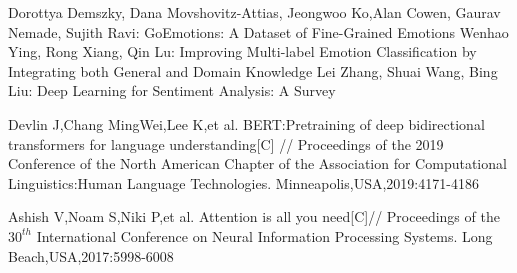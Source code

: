 \documentclass[12pt,twocolumn,letterpaper]{article}
\begin{document}
\begin{thebibliography}{99} 
Dorottya Demszky, Dana Movshovitz-Attias, Jeongwoo Ko,Alan Cowen, Gaurav Nemade, Sujith Ravi:  GoEmotions: A Dataset of Fine-Grained Emotions
Wenhao Ying, Rong Xiang, Qin Lu: Improving Multi-label Emotion Classification by Integrating both General and Domain Knowledge
Lei Zhang, Shuai Wang, Bing Liu: Deep Learning for Sentiment Analysis: A Survey

Devlin J,Chang MingWei,Lee K,et al. BERT:Pretraining of deep bidirectional transformers for language understanding[C] // Proceedings of the 2019 Conference of the North American Chapter of the Association for Computational Linguistics:Human Language Technologies. Minneapolis,USA,2019:4171-4186

Ashish V,Noam S,Niki P,et al. Attention is all you
need[C]// Proceedings of the $30^{th}$ International Conference on Neural Information Processing Systems. Long Beach,USA,2017:5998-6008

\end{thebibliography}
\end{document}
